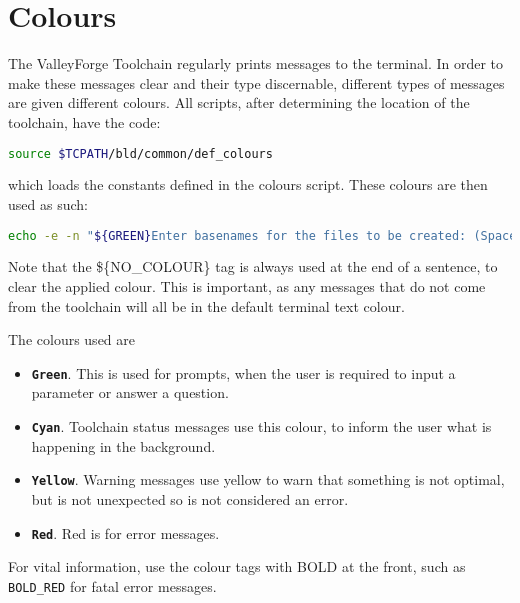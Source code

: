 \documentclass[a4paper, oneside, 11pt, titlepage, onecolumn, openright]{report}
\begin{document}
\section{Colours}
			\label{s:Colours}
			The ValleyForge Toolchain regularly prints messages to the terminal. In order to make these messages clear and their type discernable, different types of messages are given different colours. All scripts, after determining the location of the toolchain, have the code:

\begin{lstlisting}[frame=trBL, breaklines=true, language = bash]
source $TCPATH/bld/common/def_colours

\end{lstlisting}			
			
which loads the constants defined in the colours script. These colours are then used as such:

\begin{lstlisting}[frame=trBL, breaklines=true, language = bash]
echo -e -n "${GREEN}Enter basenames for the files to be created: (Space separated) ${NO_COLOUR}"
\end{lstlisting}					
			
			Note that the \$\{NO\_COLOUR\} tag is always used at the end of a sentence, to clear the applied colour. This is important, as any messages that do not come from the toolchain will all be in the default terminal text colour.
			
			The colours used are
			
\begin{itemize}

\item \textbf{\texttt{Green}}. This is used for prompts, when the user is required to input a parameter or answer a question.

\item \textbf{\texttt{Cyan}}. Toolchain status messages use this colour, to inform the user what is happening in the background.

\item \textbf{\texttt{Yellow}}. Warning messages use yellow to warn that something is not optimal, but is not unexpected so is not considered an error.

\item \textbf{\texttt{Red}}. Red is for error messages.

\end{itemize}

			For vital information, use the colour tags with BOLD at the front, such as \texttt{BOLD\_RED} for fatal error messages.
\end{document}
